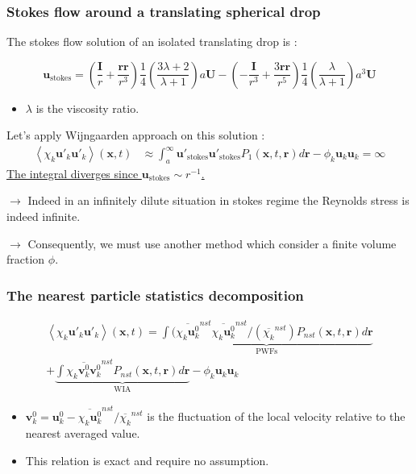 \documentclass{sintefbeamer}
\newcommand{\avg}[1]{\left<#1\right>}
\newcommand{\nstavg}[1]{\overline{#1}^{nst}}
\begin{document}
\begin{frame}
  \frametitle{Stokes flow around a translating spherical drop}
  The stokes flow solution of an isolated translating drop is :

  \begin{equation*}
    \textbf{u}_\text{stokes} 
    = \left(\frac{ \textbf{I}}{r} + \frac{\textbf{rr}}{r^3}\right)  \frac{1}{4}\left(\frac{3\lambda + 2}{\lambda +1}\right) a \textbf{U}
    - \left(-\frac{\textbf{I}}{r^3} + \frac{3 \textbf{rr} }{r^5}\right)  \frac{1}{4}\left(\frac{\lambda}{\lambda +1}\right) a^3 \textbf{U}
  \end{equation*}

  \begin{itemize}
    \item $\lambda$ is the viscosity ratio.
  \end{itemize}
  
  Let's apply Wijngaarden approach on this solution : 
  \begin{align*}
    \avg{\chi_k \textbf{u}'_k\textbf{u}'_k}(\textbf{x},t)
    &\approx \int_a^\infty \textbf{u}'_\text{stokes}\textbf{u}'_\text{stokes}  P_1(\textbf{x},t,\textbf{r}) d\textbf{r}
    - \phi_k \textbf{u}_k\textbf{u}_k
    =\infty 
  \end{align*}
  \underline{The integral diverges since $\textbf{u}_\text{stokes} \sim r^{-1}$.}

  $\to$ Indeed in an infinitely dilute situation in stokes regime the Reynolds stress is indeed infinite.

  $\to$ Consequently, we must use another method which consider a finite volume fraction $\phi$. 
\end{frame}

\begin{frame}
  \frametitle{The nearest particle statistics decomposition}
  \begin{multline*}
    \avg{\chi_k \textbf{u}'_k\textbf{u}'_k}(\textbf{x},t)
    = 
    \underbrace{\int (\nstavg{\chi_k \textbf{u}^0_k}  \nstavg{\chi_k \textbf{u}^0_k} / (\nstavg{\chi_k})  P_{nst}(\textbf{x},t,\textbf{r}) d\textbf{r} }_\text{PWFs}
    \\+\underbrace{\int \nstavg{\chi_k \textbf{v}_k^0\textbf{v}_k^0}  P_{nst}(\textbf{x},t,\textbf{r}) d\textbf{r}}_\text{WIA}
    - \phi_k \textbf{u}_k\textbf{u}_k
  \end{multline*}

\begin{itemize}
  \item $\textbf{v}_k^0  = \textbf{u}_k^0 - \nstavg{\chi_k \textbf{u}^0_k} / \nstavg{\chi_k}$ is the fluctuation of the local velocity relative to the nearest averaged value. 
  \item This relation is exact and require no assumption. 
\end{itemize}
\end{frame}
\end{document}
